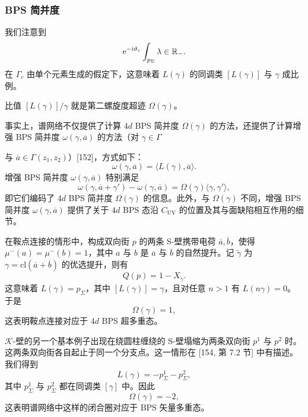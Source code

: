 \subsubsection*{BPS 简并度}

我们注意到
\[
\mathrm{e}^{-\mathrm{i}\vartheta_c}\int_{p_\Sigma}\lambda\in\mathbb{R}_-.
\]
在 $\Gamma_c$ 由单个元素生成的假定下，这意味着 $L(\gamma)$ 的同调类 $[L(\gamma)]$ 与 $\gamma$ 成比例。

\begin{proposition}[22.29]
比值 $[L(\gamma)]/\gamma$ 就是第二螺旋度超迹 $\Omega(\gamma)$。
\end{proposition}

\begin{remark}[22.30]
事实上，谱网络不仅提供了计算 $4d$ BPS 简并度 $\Omega(\gamma)$ 的方法，还提供了计算增强 BPS 简并度 $\omega(\gamma,\overline{a})$ 的方法（对 $\gamma\in\Gamma$

与 $\overline{a}\in\Gamma(z_1,z_2)$）[152]，方式如下：
\[
\omega(\gamma,\overline{a})=\langle L(\gamma),\overline{a}\rangle.
\]
增强 BPS 简并度 $\omega(\gamma,\overline{a})$ 特别满足
\[
\omega(\gamma,\overline{a}+\gamma')-\omega(\gamma,\overline{a})=\Omega(\gamma)\langle\gamma,\gamma'\rangle,
\]
即它们编码了 $4d$ BPS 简并度 $\Omega(\gamma)$ 的信息。此外，与 $\Omega(\gamma)$ 不同，增强 BPS 简并度 $\omega(\gamma,\overline{a})$ 提供了关于 $4d$ BPS 态沿 $C_{\mathrm{UV}}$ 的位置及其与面缺陷相互作用的细节。
\end{remark}

\begin{example}[22.31]
在鞍点连接的情形中，构成双向街 $p$ 的两条 S-壁携带电荷 $\overline{a},\overline{b}$，使得 $\mu^-(a)=\mu^-(b)=1$，其中 $a$ 与 $b$ 是 $\overline{a}$ 与 $\overline{b}$ 的自然提升。记 $\widetilde{\gamma}$ 为 $\gamma=\mathrm{cl}(\overline{a}+\overline{b})$ 的优选提升，则有
\[
Q(p)=1-X_{\widetilde{\gamma}}.
\]
这意味着 $L(\gamma)=p_\Sigma$，其中 $[L(\gamma)]=\gamma$，且对任意 $n>1$ 有 $L(n\gamma)=0$。于是
\[
\Omega(\gamma)=1,
\]
这表明鞍点连接对应于 $4d$ BPS 超多重态。
\end{example}

\begin{example}[22.32]
$\mathcal{K}$-壁的另一个基本例子出现在绕圆柱缠绕的 S-壁塌缩为两条双向街 $p^1$ 与 $p^2$ 时。这两条双向街各自起止于同一个分支点。这一情形在 [154, 第 7.2 节] 中有描述。我们得到
\[
L(\gamma)=-p^1_\Sigma-p^2_\Sigma,
\]
其中 $p^1_\Sigma$ 与 $p^2_\Sigma$ 都在同调类 $[\gamma]$ 中。因此
\[
\Omega(\gamma)=-2,
\]
这表明谱网络中这样的闭合圈对应于 BPS 矢量多重态。
\end{example}


